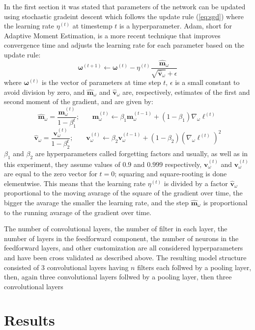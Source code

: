 \documentclass[12pt]{article}
\newcommand{\vect}[1]{\boldsymbol{#1}}
\begin{document}
In the first section it was stated that parameters of the network can be updated using stochastic gradeint descent which follows the update rule (\ref{eq:sgd}) where the learning rate $\eta^{(t)}$ at timestemp $t$ is a hyperparameter. Adam, short for Adaptive Moment Estimation, is a more recent technique that improves convergence time and adjusts the learning rate for each parameter based on the update rule:
$$
\vect{\omega}^{(t+1)}\leftarrow \vect{\omega}^{(t)}-\eta^{(t)} {\frac {\vect{{\hat {m}}}_{\omega}}{{\sqrt {\vect{{\hat {v}}}_{\omega}}}+\epsilon }}
$$
where $\vect{\omega}^{(t)}$ is the vector of parameters at time step $t$, $\epsilon$ is a small constant to avoid division by zero, and	 $\vect{{\hat {m}}}_{\omega}$ and $\vect{{\hat {v}}}_{\omega}$ are, respectively, estimates of the first and second moment of the gradient, and are given by:
$$
\vect{\hat {m}}_{\omega}={\frac {\vect{m}_{\omega}^{(t)}}{1-\beta _{1}^{t}}} \text{;}\qquad
\vect{m}_{\omega}^{(t)}\leftarrow \beta _{1}\vect{m}_{\omega}^{(t-1)}+(1-\beta _{1})\nabla _{\omega}\ell^{(t)}
$$
$$
\vect{\hat {v}}_{\omega}={\frac {\vect{v}_{\omega}^{(t)}}{1-\beta _{2}^{t}}} \text{;}\qquad
\vect{v}_{\omega}^{(t)}\leftarrow \beta _{2}\vect{v}_{\omega}^{(t-1)}+(1-\beta _{2})(\nabla _{\omega}\ell^{(t)})^2
$$
$\beta_{1}$ and $\beta_{2}$ are hyperparameters called forgetting factors and usually, as well as in this experiment, they assume values of $0.9$ and $0.999$ respectively, $ \vect{v}_{\omega}^{(t)}$ and $ \vect{v}_{\omega}^{(t)}$ are equal to the zero vector for $t=0$; squaring and square-rooting is done elementwise. This means that the learning rate $\eta^{(t)}$ is divided by a factor $\vect{\hat {v}}_{\omega}$ proportional to the moving avarage of the square of the gradient over time, the bigger the avarage the smaller the learning rate, and the step $\vect{\hat {m}}_{\omega}$ is proportional to the running avarage of the gradient over time.

The number of convolutional layers, the number of filter in each layer, the number of layers in the feedforward component, the number of neurons in the feedforward layers, and other customization are all considered hyperparameters and have been cross validated as described above. The resulting model structure consisted of 3 convolutional layers having $n$ filters each follwed by a pooling layer, then, again three convolutional layers follwed by a pooling layer, then three convolutional layers





\section*{Results}

\end{document}

